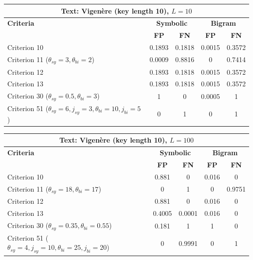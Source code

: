 \begin{center}
\renewcommand{\arraystretch}{1.2}
\setlength{\tabcolsep}{6pt}
\begin{tabular}{|l||c|c||c|c|}
\hline
\multicolumn{5}{|c|}{\textbf{Text: Vigenère (key length 10), $L=10$}} \\
\hline
\textbf{Criteria} & \multicolumn{2}{c||}{\textbf{Symbolic}} & \multicolumn{2}{c|}{\textbf{Bigram}} \\
\hline
 & \textbf{FP} & \textbf{FN} & \textbf{FP} & \textbf{FN} \\
\hline
Criterion 10 & 0.1893 & 0.1818 & 0.0015 & 0.3572 \\
Criterion 11 ($\theta_{sy}=3, \theta_{bi}=2$) & 0.0009 & 0.8816 & 0 & 0.7414 \\
Criterion 12 & 0.1893 & 0.1818 & 0.0015 & 0.3572 \\
Criterion 13 & 0.1893 & 0.1818 & 0.0015 & 0.3572 \\
Criterion 30 ($\theta_{sy}=0.5, \theta_{bi}=3$) & 1 & 0 & 0.0005 & 1 \\
Criterion 51 ($\theta_{sy}=6, j_{sy}=3, \theta_{bi}=10, j_{bi}=5$) & 0 & 1 & 0 & 1 \\
\hline
\end{tabular}
\end{center}

\begin{center}
\renewcommand{\arraystretch}{1.2}
\setlength{\tabcolsep}{6pt}
\begin{tabular}{|l||c|c||c|c|}
\hline
\multicolumn{5}{|c|}{\textbf{Text: Vigenère (key length 10), $L=100$}} \\
\hline
\textbf{Criteria} & \multicolumn{2}{c||}{\textbf{Symbolic}} & \multicolumn{2}{c|}{\textbf{Bigram}} \\
\hline
 & \textbf{FP} & \textbf{FN} & \textbf{FP} & \textbf{FN} \\
\hline
Criterion 10 & 0.881 & 0 & 0.016 & 0 \\
Criterion 11 ($\theta_{sy}=18, \theta_{bi}=17$) & 0 & 1 & 0 & 0.9751 \\
Criterion 12 & 0.881 & 0 & 0.016 & 0 \\
Criterion 13 & 0.4005 & 0.0001 & 0.016 & 0 \\
Criterion 30 ($\theta_{sy}=0.35, \theta_{bi}=0.55$) & 0.181 & 1 & 1 & 0 \\
Criterion 51 ($\theta_{sy}=4, j_{sy}=10, \theta_{bi}=25, j_{bi}=20$) & 0 & 0.9991 & 0 & 1 \\
\hline
\end{tabular}
\end{center}

